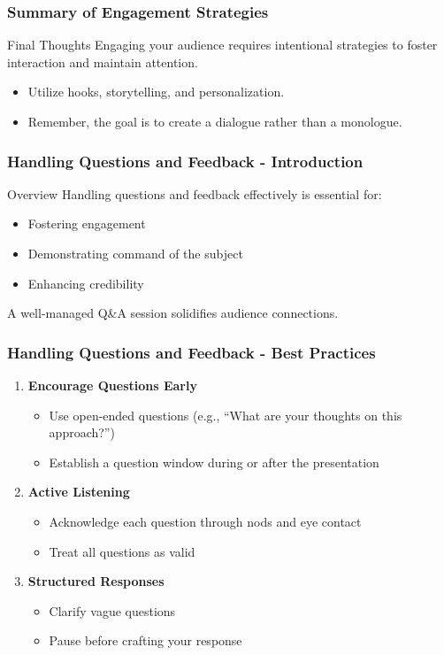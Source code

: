 \documentclass[aspectratio=169]{beamer}
\begin{document}
\begin{frame}[fragile]
    \frametitle{Summary of Engagement Strategies}
    \begin{block}{Final Thoughts}
        Engaging your audience requires intentional strategies to foster interaction and maintain attention.
    \end{block}
    \begin{itemize}
        \item Utilize hooks, storytelling, and personalization.
        \item Remember, the goal is to create a dialogue rather than a monologue.
    \end{itemize}
\end{frame}

\begin{frame}[fragile]
    \frametitle{Handling Questions and Feedback - Introduction}
    \begin{block}{Overview}
        Handling questions and feedback effectively is essential for:
        \begin{itemize}
            \item Fostering engagement
            \item Demonstrating command of the subject
            \item Enhancing credibility
        \end{itemize}
        A well-managed Q\&A session solidifies audience connections.
    \end{block}
\end{frame}

\begin{frame}[fragile]
    \frametitle{Handling Questions and Feedback - Best Practices}
    \begin{enumerate}
        \item \textbf{Encourage Questions Early}
        \begin{itemize}
            \item Use open-ended questions (e.g., ``What are your thoughts on this approach?'')
            \item Establish a question window during or after the presentation
        \end{itemize}
        
        \item \textbf{Active Listening}
        \begin{itemize}
            \item Acknowledge each question through nods and eye contact
            \item Treat all questions as valid
        \end{itemize}
       
        \item \textbf{Structured Responses}
        \begin{itemize}
            \item Clarify vague questions 
            \item Pause before crafting your response
        \end{itemize}
    \end{enumerate}
\end{frame}
\end{document}
